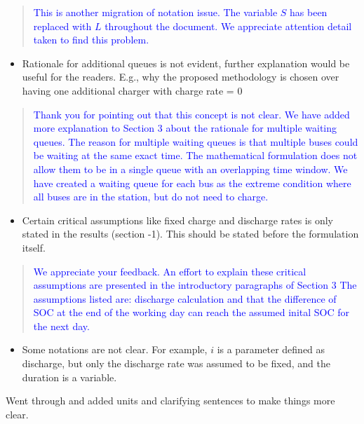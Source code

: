 \documentclass[11pt,a4paper,final]{article}
\begin{document}
\begin{quote}
\textcolor{blue}{This is another migration of notation issue. The variable $S$ has been replaced with $L$ throughout the document. We appreciate attention detail taken to find this problem.}
\end{quote}

\begin{itemize}
\item Rationale for additional queues is not evident, further explanation would be useful for the readers. E.g., why the proposed methodology is chosen over having one additional charger with charge rate = 0
\end{itemize}


\begin{quote}
\textcolor{blue}{Thank you for pointing out that this concept is not clear. We have added more explanation to Section 3 about the rationale for multiple waiting queues. The reason for multiple waiting queues is that multiple buses could be waiting at the same exact time. The mathematical formulation does not allow them to be in a single queue with an overlapping time window. We have created a waiting queue for each bus as the extreme condition where all buses are in the station, but do not need to charge.}
\end{quote}

\begin{itemize}
\item Certain critical assumptions like fixed charge and discharge rates is only stated in the results (section -1). This should be stated before the formulation itself.
\end{itemize}

\begin{quote}
\textcolor{blue}{We appreciate your feedback. An effort to explain these critical assumptions are presented in the introductory paragraphs of Section 3 The assumptions listed are: discharge calculation and that the difference of SOC at the end of the working day can reach the assumed inital SOC for the next day.}
\end{quote}

\begin{itemize}
\item Some notations are not clear. For example, \(i\) is a parameter defined as discharge, but only the discharge rate was assumed to be fixed, and the duration is a variable.
\end{itemize}

Went through and added units and clarifying sentences to make things more clear.
\end{document}
